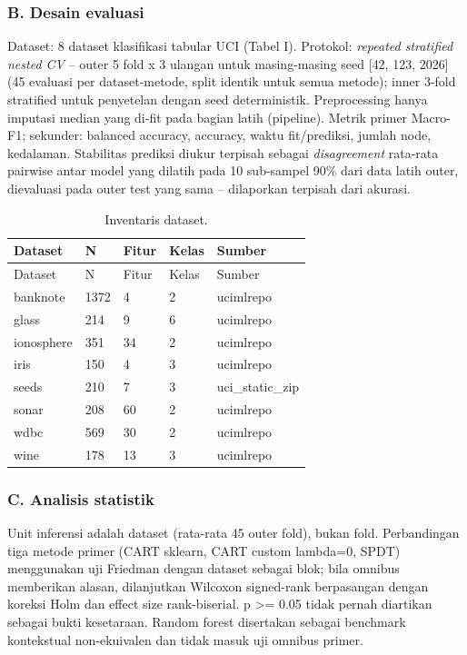 \documentclass[
  conference]{IEEEtran}
\begin{document}
\subsubsection{B. Desain evaluasi}\label{b.-desain-evaluasi}

Dataset: 8 dataset klasifikasi tabular UCI (Tabel I). Protokol:
\emph{repeated stratified nested CV} -- outer 5 fold x 3 ulangan untuk
masing-masing seed {[}42, 123, 2026{]} (45 evaluasi per dataset-metode,
split identik untuk semua metode); inner 3-fold stratified untuk
penyetelan dengan seed deterministik. Preprocessing hanya imputasi
median yang di-fit pada bagian latih (pipeline). Metrik primer Macro-F1;
sekunder: balanced accuracy, accuracy, waktu fit/prediksi, jumlah node,
kedalaman. Stabilitas prediksi diukur terpisah sebagai
\emph{disagreement} rata-rata pairwise antar model yang dilatih pada 10
sub-sampel 90\% dari data latih outer, dievaluasi pada outer test yang
sama -- dilaporkan terpisah dari akurasi.

\begin{longtable}[]{@{}lllll@{}}
\caption{Inventaris dataset.}\tabularnewline
\toprule\noalign{}
Dataset & N & Fitur & Kelas & Sumber \\
\midrule\noalign{}
\endfirsthead
\toprule\noalign{}
Dataset & N & Fitur & Kelas & Sumber \\
\midrule\noalign{}
\endhead
\bottomrule\noalign{}
\endlastfoot
banknote & 1372 & 4 & 2 & ucimlrepo \\
glass & 214 & 9 & 6 & ucimlrepo \\
ionosphere & 351 & 34 & 2 & ucimlrepo \\
iris & 150 & 4 & 3 & ucimlrepo \\
seeds & 210 & 7 & 3 & uci\_static\_zip \\
sonar & 208 & 60 & 2 & ucimlrepo \\
wdbc & 569 & 30 & 2 & ucimlrepo \\
wine & 178 & 13 & 3 & ucimlrepo \\
\end{longtable}

\subsubsection{C. Analisis statistik}\label{c.-analisis-statistik}

Unit inferensi adalah dataset (rata-rata 45 outer fold), bukan fold.
Perbandingan tiga metode primer (CART sklearn, CART custom lambda=0,
SPDT) menggunakan uji Friedman dengan dataset sebagai blok; bila omnibus
memberikan alasan, dilanjutkan Wilcoxon signed-rank berpasangan dengan
koreksi Holm dan effect size rank-biserial. p \textgreater= 0.05 tidak
pernah diartikan sebagai bukti kesetaraan. Random forest disertakan
sebagai benchmark kontekstual non-ekuivalen dan tidak masuk uji omnibus
primer.
\end{document}

